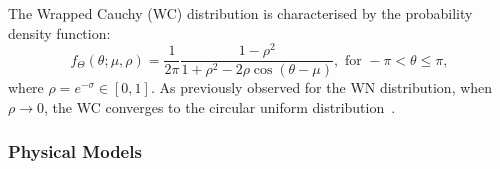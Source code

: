 \documentclass[remotesensing,article,submit,pdftex,moreauthors]{Definitions/mdpi}
\begin{document}
The Wrapped Cauchy (WC) distribution is characterised by the probability density function:
\begin{equation}\label{sec:sec3.1.5_cap3Eq2}
	f_{\Theta}(\theta;\mu,\rho) = \frac{1}{2\pi} \frac{1-\rho^2}{1+\rho^2-2\rho\cos(\theta-\mu)} ,
	\text{ for }-\pi < \theta \leq \pi,
\end{equation}
where $\rho = e^{-\sigma} \in [0, 1]$.
As previously observed for the WN distribution, when $\rho \rightarrow 0$, the WC converges to the circular uniform distribution~\cite{CircularStatisticsinR}.
%
%

\subsubsection{Physical Models}\label{subsec:physical_model_pd}
\end{document}
